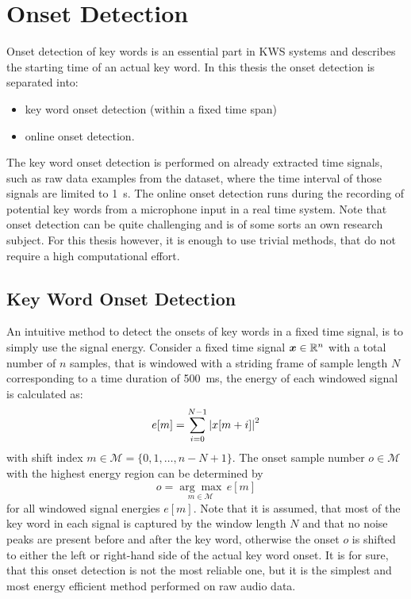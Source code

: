 
\section{Onset Detection}\label{sec:signal_onset}
\thesisStateRevised
Onset detection of key words is an essential part in KWS systems and describes the starting time of an actual key word.
In this thesis the onset detection is separated into:
\begin{itemize}
  \item key word onset detection (within a fixed time span)
  \item online onset detection.
\end{itemize}
The key word onset detection is performed on already extracted time signals, such as raw data examples from the dataset, where the time interval of those signals are limited to \SI{1}{\second}.
The online onset detection runs during the recording of potential key words from a microphone input in a real time system.
Note that onset detection can be quite challenging and is of some sorts an own research subject.
For this thesis however, it is enough to use trivial methods, that do not require a high computational effort.



\subsection{Key Word Onset Detection}\label{sec:signal_onset_kw}
An intuitive method to detect the onsets of key words in a fixed time signal, is to simply use the signal energy.
Consider a fixed time signal $\bm{x} \in \mathbb{R}^n$ with a total number of $n$ samples, that is windowed with a striding frame of sample length $N$ corresponding to a time duration of \SI{500}{\milli\second}, the energy of each windowed signal is calculated as:
\begin{equation}\label{eq:e_win}
  e[m] = \sum_{i=0}^{N-1} \abs{x[m + i]}^2
\end{equation}
with shift index $m \in \mathcal{M} = \{0, 1, \dots, n - N + 1\}$.
The onset sample number $o \in \mathcal{M}$ with the highest energy region can be determined by
\begin{equation}\label{eq:onset}
  o = \underset{m \in \mathcal{M}}{\arg \max} \, e[m]
\end{equation}
for all windowed signal energies $e[m]$.
Note that it is assumed, that most of the key word in each signal is captured by the window length $N$ and that no noise peaks are present before and after the key word, otherwise the onset $o$ is shifted to either the left or right-hand side of the actual key word onset.
It is for sure, that this onset detection is not the most reliable one, but it is the simplest and most energy efficient method performed on raw audio data.

